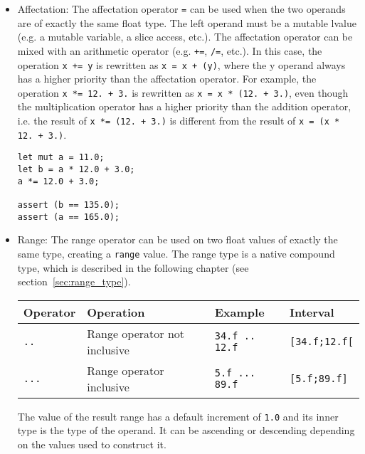 \begin{itemize}
\item Affectation: The affectation operator \texttt{=} can be used when the two
  operands are of exactly the same float type. The left operand must be a
  mutable lvalue (e.g. a mutable variable, a slice access, etc.). The
  affectation operator can be mixed with an arithmetic operator (e.g.
  \texttt{+=}, \texttt{/=}, etc.). In this case, the operation \texttt{x += y}
  is rewritten as \texttt{x = x + (y)}, where the y operand always has a higher
  priority than the affectation operator. For example, the operation \texttt{x
    *= 12. + 3.} is rewritten as \texttt{x = x * (12. + 3.)}, even though the
  multiplication operator has a higher priority than the addition operator, i.e.
  the result of \texttt{x *= (12. + 3.)} is different from the result of
  \texttt{x = (x * 12. + 3.)}.

  \begin{lstlisting}[style=coloredverbatim]
let mut a = 11.0;
let b = a * 12.0 + 3.0;
a *= 12.0 + 3.0;

assert (b == 135.0);
assert (a == 165.0);
  \end{lstlisting}

\item Range: The range operator can be used on two float values of exactly the
  same type, creating a \texttt{range} value. The range type is a native
  compound type, which is described in the following chapter (see
  section~\ref{sec:range_type}).

  \begin{center}
    \vspace{-20pt}
    \begin{adjustbox}{max width=1.0\linewidth}
      \begin{tabular}{|l|lll|}
        \hline
        Operator & Operation & Example & Interval\\[0pt]
        \hline
        \hline
        \texttt{..} & Range operator not inclusive & \texttt{34.f .. 12.f} & \texttt{[34.f;12.f[}\\[0pt]
            \texttt{...} & Range operator inclusive & \texttt{5.f ... 89.f} & \texttt{[5.f;89.f]}\\[0pt]
            \hline
      \end{tabular}
    \end{adjustbox}
  \end{center}


  The value of the result range has a default increment of \texttt{1.0} and its
  inner type is the type of the operand. It can be ascending or descending
  depending on the values used to construct it.

\end{itemize}

